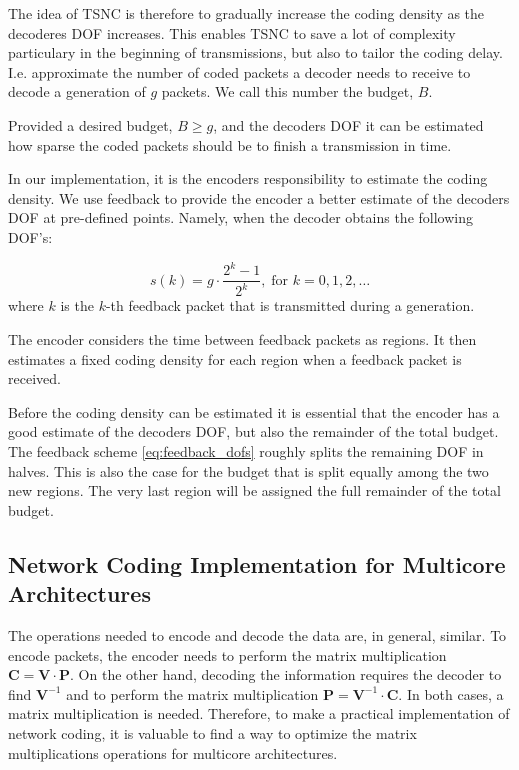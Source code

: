 The idea of \ac{TSNC} is therefore to gradually increase the coding density
as the decoderes \ac{DOF} increases. This enables TSNC to save a lot of
complexity particulary in the beginning of transmissions, but also to
tailor the coding delay. I.e. approximate the number of coded packets a
decoder needs to receive to decode a generation of $g$ packets. We call
this number the budget, $B$.

Provided a desired budget, $B \geq g$, and the decoders \ac{DOF} it can be
estimated how sparse the coded packets should be to finish a transmission in
time.

In our implementation, it is the encoders responsibility to estimate the coding
density. We use feedback to provide the encoder a better estimate of the
decoders \ac{DOF} at pre-defined points. Namely, when the decoder obtains the
following \ac{DOF}'s:

\begin{equation}\label{eq:feedback_dofs}
    s(k) = g\cdot \frac{2^k -1}{2^k},  \; \text{for } k=0,1,2,\dots
\end{equation}
where $k$ is the $k$-th feedback packet that is transmitted during a generation.

The encoder considers the time between feedback packets as regions. It then
estimates a fixed coding density for each region when a feedback packet is
received.

Before the coding density can be estimated it is essential that the encoder
has a good estimate of the decoders \ac{DOF}, but also the remainder of the
total budget. The feedback scheme \ref{eq:feedback_dofs} roughly splits the
remaining \ac{DOF} in halves. This is also the case for the budget that is
split equally among the two new regions. The very last region will be assigned
the full remainder of the total budget.

\subsection{Network Coding Implementation for Multicore Architectures}
\label{sub:implementation-multicore}

The operations needed to encode and decode the data are, in general, similar. To
encode packets, the encoder needs to perform the matrix multiplication
$\textbf{C} = \textbf{V} \cdot \textbf{P}$. On the other hand, decoding the
information requires the decoder to find $\textbf{V}^{-1}$ and to perform the
matrix multiplication $\textbf{P} = \textbf{V}^{-1} \cdot \textbf{C}$. In both
cases, a matrix multiplication is needed. Therefore, to make a practical
implementation of network coding, it is valuable to find a way to optimize the
matrix multiplications operations for multicore architectures.

